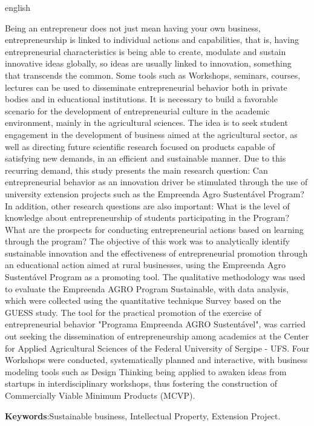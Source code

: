 \setlength{\absparsep}{18pt} %
\begin{resumo}[Abstract]
 \begin{otherlanguage*}{english}
   
Being an entrepreneur does not just mean having your own business, entrepreneurship is linked to individual actions and capabilities, that is, having entrepreneurial characteristics is being able to create, modulate and sustain innovative ideas globally, so ideas are usually linked to innovation, something that transcends the common. Some tools such as Workshops, seminars, courses, lectures can be used to disseminate entrepreneurial behavior both in private bodies and in educational institutions. It is necessary to build a favorable scenario for the development of entrepreneurial culture in the academic environment, mainly in the agricultural sciences. The idea is to seek student engagement in the development of business aimed at the agricultural sector, as well as directing future scientific research focused on products capable of satisfying new demands, in an efficient and sustainable manner. Due to this recurring demand, this study presents the main research question: Can entrepreneurial behavior as an innovation driver be stimulated through the use of university extension projects such as the Empreenda Agro Sustentável Program? In addition, other research questions are also important: What is the level of knowledge about entrepreneurship of students participating in the Program? What are the prospects for conducting entrepreneurial actions based on learning through the program? The objective of this work was to analytically identify sustainable innovation and the effectiveness of entrepreneurial promotion through an educational action aimed at rural businesses, using the Empreenda Agro Sustentável Program as a promoting tool. The qualitative methodology was used to evaluate the Empreenda AGRO Program
Sustainable, with data analysis, which were collected using the quantitative technique
Survey based on the GUESS study. The tool for the practical promotion of the exercise of entrepreneurial behavior "Programa Empreenda AGRO Sustentável", was carried out seeking the dissemination of entrepreneurship among academics at the Center for Applied Agricultural Sciences of the Federal University of Sergipe - UFS. Four Workshops were conducted, systematically planned and interactive, with business modeling tools such as Design Thinking being applied to awaken ideas from startups in interdisciplinary workshops, thus fostering the construction of Commercially Viable Minimum Products (MCVP).

 \textbf{Keywords}:Sustainable business, Intellectual Property, Extension Project.
 \end{otherlanguage*}
\end{resumo}